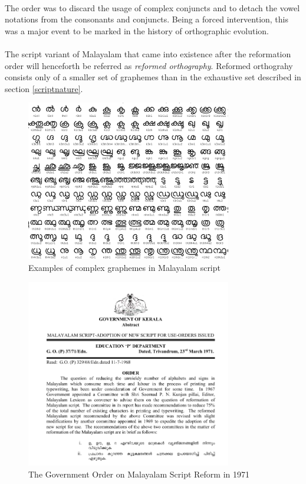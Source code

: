 \documentclass[10pt]{article}
\begin{document}
\paragraph{}
The order was to discard the usage of complex conjuncts and to detach the vowel notations from the consonants and conjuncts. Being a forced intervention, this was a major event to be marked in the history of orthographic evolution. 

\paragraph{}
The script variant of Malayalam that came into existence after the reformation order will henceforth be referred as \textit{reformed orthography}. Reformed orthograhy consists only of a smaller set of graphemes than in the exhaustive set described in section \ref{scriptnature}.


\begin{figure}[h!]
	\centering
	\includegraphics[width=0.8\textwidth]{images/complexgraphemes.png}
	\caption{Examples of complex graphemes in Malayalam script}
	\label{complexgrapheme}
\end{figure}


\begin{figure}[h!]
	\centering
	\includegraphics[width=0.8\textwidth]{images/1971-gov-script-reformation-order.png}
	\caption{The Government Order on Malayalam Script Reform in 1971}
	\label{go1971}
\end{figure}
\end{document}
